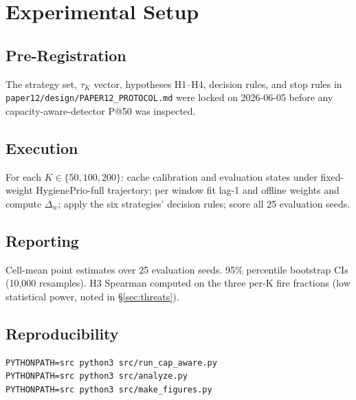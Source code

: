 \section{Experimental Setup}

\subsection{Pre-Registration}

The strategy set, $\tau_K$ vector, hypotheses H1--H4, decision rules,
and stop rules in \texttt{paper12/design/PAPER12\_PROTOCOL.md} were
locked on 2026-06-05 before any capacity-aware-detector P@50 was
inspected.

\subsection{Execution}

For each $K \in \{50, 100, 200\}$: cache calibration and evaluation
states under fixed-weight HygienePrio-full trajectory; per window
fit lag-1 and offline weights and compute $\Delta_w$; apply the six
strategies' decision rules; score all 25 evaluation seeds.

\subsection{Reporting}

Cell-mean point estimates over 25 evaluation seeds. 95\% percentile
bootstrap CIs (10{,}000 resamples). H3 Spearman computed on the
three per-K fire fractions (low statistical power, noted in
\S\ref{sec:threats}).

\subsection{Reproducibility}

{\small\begin{verbatim}
PYTHONPATH=src python3 src/run_cap_aware.py
PYTHONPATH=src python3 src/analyze.py
PYTHONPATH=src python3 src/make_figures.py
\end{verbatim}}
